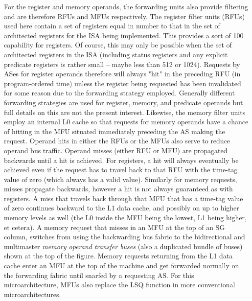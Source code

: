\documentclass{book}
\begin{document}
For the register and memory operands, the 
forwarding units also provide filtering and are therefore RFUs and
MFUs respectively.
The register filter units (RFUs) used here contain a set of registers
equal in number to that in the set of architected registers for the
ISA being implemented.  This provides a sort of 100%
capability for registers.  Of course, this may only be possible when the
set of architected registers in the ISA (including status registers
and any explicit predicate registers is rather small -- maybe less than
512 or 1024).  Requests by ASes for register operands therefore
will always "hit" in the preceding RFU (in program-ordered time)
unless the register being requested has been invalidated for some
reason due to the forwarding strategy employed.  Generally
different forwarding strategies are used for register, memory,
and predicate operands but full details on this are not the
present interest.
Likewise, the memory filter units employ an internal L0 cache
so that requests for memory operands have a chance of hitting
in the MFU situated immediately preceding the AS making the request.
Operand hits in either the RFUs or the MFUs also serve to
reduce operand bus traffic.  Operand misses (either RFU or
MFU) are propagated backwards until a hit is achieved.
For registers, a hit will always eventually be achieved even if the request
has to travel back to that RFU with the time-tag value of zero
(which always has a valid value).
Similarly for memory requests, misses propagate backwards, however
a hit is not always guaranteed as with registers.  A miss that
travels back through that MFU that has a time-tag value of
zero continues backward to the L1 data cache, and possibly on
up to higher 
memory levels as well (the L0 inside the MFU being the lowest,
L1 being higher, et cetera).  
A memory request that misses in an
MFU at the top of an SG column, switches from
using the backwarding bus fabric to the bidirectional and
multimaster \textit{memory operand
transfer buses} (also a duplicated bundle of buses) shown at the top
of the figure.  Memory requests returning from the L1 data cache
enter an MFU at the top of the machine and get forwarded
normally on the forwarding fabric until snarfed by a requesting AS.
For this microarchitecture, MFUs also 
replace the LSQ function in more
conventional microarchitectures.
%
%
\end{document}
